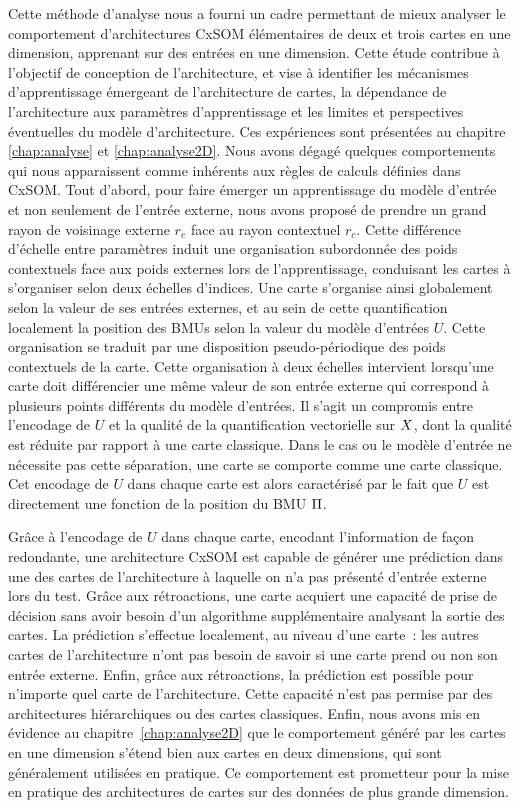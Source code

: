 Cette méthode d'analyse nous a fourni un cadre permettant de mieux analyser le comportement d'architectures CxSOM élémentaires de deux et trois cartes en une dimension, apprenant sur des entrées en une dimension. Cette étude contribue à l'objectif de conception de l'architecture, et vise à identifier les mécanismes d'apprentissage émergeant de l'architecture de cartes, la dépendance de l'architecture aux paramètres d'apprentissage et les limites et perspectives éventuelles du modèle d'architecture.
Ces expériences sont présentées au chapitre \ref{chap:analyse} et \ref{chap:analyse2D}.
Nous avons dégagé quelques comportements qui nous apparaissent comme inhérents aux règles de calculs définies dans CxSOM.
Tout d'abord, pour faire émerger un apprentissage du modèle d'entrée et non seulement de l'entrée externe, nous avons proposé de prendre un grand rayon de voisinage externe $r_e$ face au rayon contextuel $r_c$. 
Cette différence d'échelle entre paramètres induit une organisation subordonnée des poids contextuels face aux poids externes lors de l'apprentissage, conduisant les cartes à s'organiser selon deux échelles d'indices. Une carte s'organise ainsi globalement selon la valeur de ses entrées externes, et au sein de cette quantification localement la position des BMUs selon la valeur du modèle d'entrées $U$. Cette organisation se traduit par une disposition pseudo-périodique des poids contextuels de la carte.
Cette organisation à deux échelles intervient lorsqu'une carte doit différencier une même valeur de son entrée externe qui correspond à plusieurs points différents du modèle d'entrées. 
Il s'agit un compromis entre l'encodage de $U$ et la qualité de la quantification vectorielle sur $X$, dont la qualité est réduite par rapport à une carte classique.
Dans le cas ou le modèle d'entrée ne nécessite pas cette séparation, une carte se comporte comme une carte classique.
Cet encodage de $U$ dans chaque carte est alors caractérisé par le fait que $U$ est directement une fonction de la position du BMU $\Pi$.
    
Grâce à l'encodage de $U$ dans chaque carte, encodant l'information de façon redondante, une architecture CxSOM est capable de générer une prédiction dans une des cartes de l'architecture à laquelle on n'a pas présenté d'entrée externe lors du test. 
Grâce aux rétroactions, une carte acquiert une capacité de prise de décision sans avoir besoin d'un algorithme supplémentaire analysant la sortie des cartes. La prédiction s'effectue localement, au niveau d'une carte~: les autres cartes de l'architecture n'ont pas besoin de savoir si une carte prend ou non son entrée externe. Enfin, grâce aux rétroactions, la prédiction est possible pour n'importe quel carte de l'architecture. Cette capacité n'est pas permise par des architectures hiérarchiques ou des cartes classiques.
Enfin, nous avons mis en évidence au chapitre~\ref{chap:analyse2D} que le comportement généré par les cartes en une dimension s'étend bien aux cartes en deux dimensions, qui sont généralement utilisées en pratique. Ce comportement est prometteur pour la mise en pratique des architectures de cartes sur des données de plus grande dimension.


